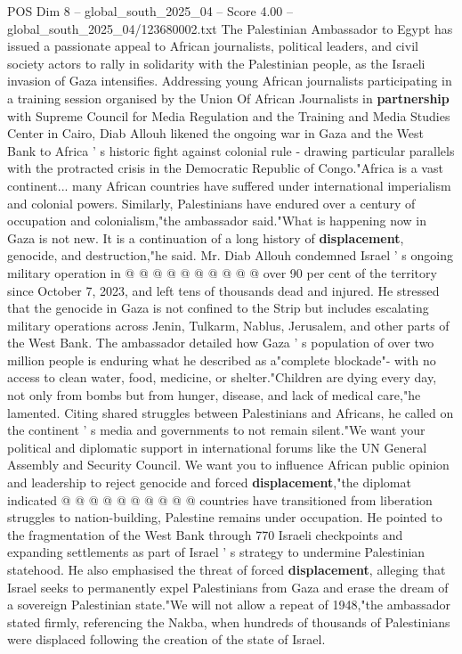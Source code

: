\begin{textsample}{POS Dim 8 – global\_south\_2025\_04 – Score 4.00 – global\_south\_2025\_04/123680002.txt}  \label{ex:f8_pos_169}
The Palestinian Ambassador to Egypt has issued a passionate appeal to African journalists, political leaders, and civil society actors to rally in solidarity with the Palestinian people, as the Israeli invasion of Gaza intensifies.
Addressing young African journalists participating in a training session organised by the Union Of African Journalists in \textbf{partnership} with Supreme Council for Media Regulation and the Training and Media Studies Center in Cairo, Diab Allouh likened the ongoing war in Gaza and the West Bank to Africa ' s historic fight against colonial rule - drawing particular parallels with the protracted crisis in the Democratic Republic of Congo."Africa is a vast continent... many African countries have suffered under international imperialism and colonial powers.
Similarly, Palestinians have endured over a century of occupation and colonialism,"the ambassador said."What is happening now in Gaza is not new.
It is a continuation of a long history of \textbf{displacement}, genocide, and destruction,"he said.
Mr.
Diab Allouh condemned Israel ' s ongoing military operation in @ @ @ @ @ @ @ @ @ @ over 90 per cent of the territory since October 7, 2023, and left tens of thousands dead and injured.
He stressed that the genocide in Gaza is not confined to the Strip but includes escalating military operations across Jenin, Tulkarm, Nablus, Jerusalem, and other parts of the West Bank.
The ambassador detailed how Gaza ' s population of over two million people is enduring what he described as a"complete blockade"- with no access to clean water, food, medicine, or shelter."Children are dying every day, not only from bombs but from hunger, disease, and lack of medical care,"he lamented.
Citing shared struggles between Palestinians and Africans, he called on the continent ' s media and governments to not remain silent."We want your political and diplomatic support in international forums like the UN General Assembly and Security Council.
We want you to influence African public opinion and leadership to reject genocide and forced \textbf{displacement},"the diplomat indicated @ @ @ @ @ @ @ @ @ @ countries have transitioned from liberation struggles to nation-building, Palestine remains under occupation.
He pointed to the fragmentation of the West Bank through 770 Israeli checkpoints and expanding settlements as part of Israel ' s strategy to undermine Palestinian statehood.
He also emphasised the threat of forced \textbf{displacement}, alleging that Israel seeks to permanently expel Palestinians from Gaza and erase the dream of a sovereign Palestinian state."We will not allow a repeat of 1948,"the ambassador stated firmly, referencing the Nakba, when hundreds of thousands of Palestinians were displaced following the creation of the state of Israel.

\end{textsample}
